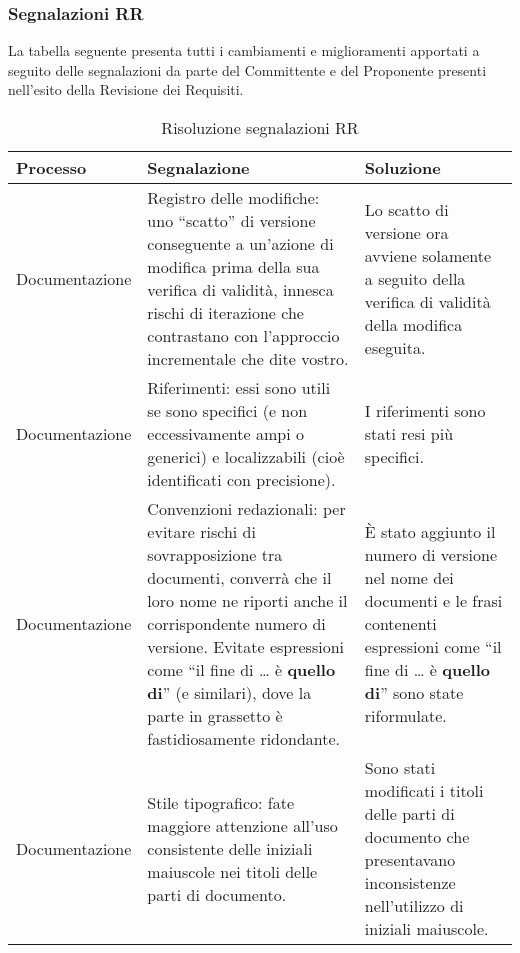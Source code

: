 		\subsubsection{Segnalazioni RR}
			La tabella seguente presenta tutti i cambiamenti e miglioramenti apportati a seguito delle segnalazioni da parte del Committente e del Proponente presenti nell'esito della Revisione dei Requisiti.
			\begin{longtable}{ 
				>{\centering}p{} 
				>{\centering}p{}
				>{\centering\arraybackslash}p{}}
	
				\caption {Risoluzione segnalazioni RR} \\
		
				\textbf{\color{white}Processo} &
				\textbf{\color{white}Segnalazione} &
				\textbf{\color{white}Soluzione}
				\tabularnewline  
				\endhead
		
		
				Documentazione
					&
				 Registro delle modifiche: uno “scatto” di versione conseguente a un'azione di modifica prima della sua verifica di validità, innesca rischi di iterazione che contrastano con l'approccio incrementale che dite vostro. 
					&
				Lo scatto di versione ora avviene solamente a seguito della verifica di validità della modifica eseguita.
					\\
			
				Documentazione
					&
				Riferimenti: essi sono utili se sono specifici (e non eccessivamente ampi o generici) e localizzabili (cioè identificati con precisione).
					&
				I riferimenti sono stati resi più specifici.
					\\
		
				Documentazione
					&
				Convenzioni redazionali: per evitare rischi di sovrapposizione tra documenti, converrà che il loro nome ne riporti anche il corrispondente numero di versione. Evitate espressioni come “il fine di … è \textbf{quello di}” (e similari), dove la parte in grassetto è fastidiosamente ridondante.
					&
				È stato aggiunto il numero di versione nel nome dei documenti e le frasi contenenti espressioni come “il fine di … è \textbf{quello di}” sono state riformulate.
					\\
		
				Documentazione
					&
				Stile tipografico: fate maggiore attenzione all'uso consistente delle iniziali maiuscole nei titoli delle parti di documento.
					&
				Sono stati modificati i titoli delle parti di documento che presentavano inconsistenze nell'utilizzo di iniziali maiuscole.
					\\
						

\end{longtable}
